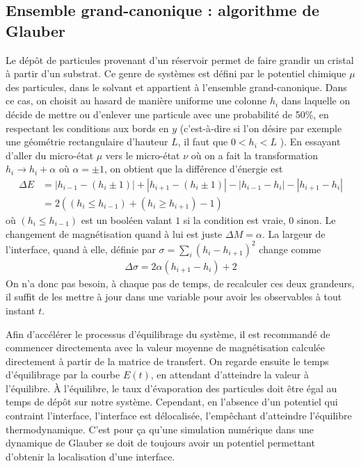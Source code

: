 	\subsection{Ensemble grand-canonique : algorithme de Glauber}
Le dépôt de particules provenant d'un réservoir permet de faire grandir un cristal à partir d'un substrat. Ce genre de systèmes est défini par le potentiel chimique $\mu$ des particules, dans le solvant et appartient à l'ensemble grand-canonique. Dans ce cas, on choisit au hasard de manière uniforme une colonne $h_i$ dans laquelle on décide de mettre ou d'enlever une particule avec une probabilité de 50\%, en respectant les conditions aux bords en $y$ (c'est-à-dire si l'on désire par exemple une géométrie rectangulaire d'hauteur $L$, il faut que $0<h_i<L$ ). En essayant d'aller du micro-état $\mu$ vers le micro-état $\nu$ où on a fait la transformation $h_i \rightarrow h_i + \alpha$ où $\alpha=\pm 1$, on obtient que la différence d'énergie est
\begin{align}
	\Delta E &= |h_{i-1}-(h_i \pm 1)| + |h_{i+1}-(h_i \pm 1)| - |h_{i-1}-h_i| - |h_{i+1}-h_i|  \\
		&= 2 \left( (h_i \leq h_{i-1}) + (h_i \geq h_{i+1}) -1 \right )
\end{align}
où $(h_i \leq h_{i-1})$ est un booléen valant $1$ si la condition est vraie, $0$ sinon.
Le changement de magnétisation quand à lui est juste $\Delta M = \alpha$. La largeur de l'interface, quand à elle, définie par $\sigma = \sum_i (h_i-h_{i+1})^2$ change comme
\begin{align}
	\Delta \sigma = 2 \alpha (h_{i+1}-h_i) + 2
\end{align}
On n'a donc pas besoin, à chaque pas de temps, de recalculer ces deux grandeurs, il suffit de les mettre à jour dans une variable pour avoir les observables à tout instant $t$.



Afin d'accélérer le processus d'équilibrage du système, il est recommandé de commencer directementa avec la valeur moyenne de magnétisation calculée directement à partir de la matrice de transfert. On regarde ensuite le temps d'équilibrage par la courbe $E(t)$, en attendant d'atteindre la valeur à l'équilibre. 
À l'équilibre, le taux d'évaporation des particules doit être égal au temps de dépôt sur notre système. Cependant, en l'absence d'un potentiel qui contraint l'interface, l'interface est délocalisée, l'empêchant d'atteindre l'équilibre thermodynamique. C'est pour ça qu'une simulation numérique dans une dynamique de Glauber se doit de toujours avoir un potentiel permettant d'obtenir la localisation d'une interface. 

